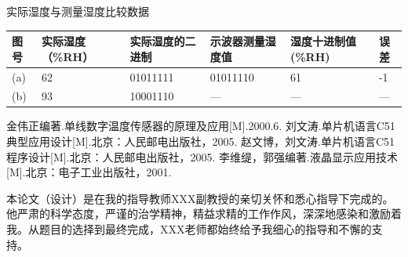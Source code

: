 \documentclass{thxythesis}
\begin{document}
\begin{Table}[!htbp]
\caption{实际湿度与测量湿度比较数据}
\label{tab:t1}
\begin{center}
\begin{tabular}{ p{2cm}<{\centering} |p{2cm}|p{2cm}|p{2cm}|p{2cm}|p{2cm}<{\centering}}
\hline
图号 & 实际湿度（\%RH）& 实际湿度的二进制 & 示波器测量湿度值 & 湿度十进制值(\%RH) & 误差 \\ \hline
(a) &  62  &  01011111  &  01011110   &   61  &  -1\\ \hline
(b) &  93  &  10001110  &  —  & —  & —\\ \hline
\end{tabular}
\end{center}
\end{Table}


\begin{Reference}
金伟正编著.单线数字温度传感器的原理及应用[M].2000.6.
刘文涛.单片机语言C51典型应用设计[M].北京：人民邮电出版社，2005.
赵文博，刘文涛.单片机语言C51程序设计[M].北京：人民邮电出版社，2005.
李维缇，郭强编著.液晶显示应用技术[M].北京：电子工业出版社，2001.
\end{Reference}


\begin{Thanks}
本论文（设计）是在我的指导教师XXX副教授的亲切关怀和悉心指导下完成的。他严肃的科学态度，严谨的治学精神，精益求精的工作作风，深深地感染和激励着我。从题目的选择到最终完成，XXX老师都始终给予我细心的指导和不懈的支持。
\end{Thanks}
\end{document}
